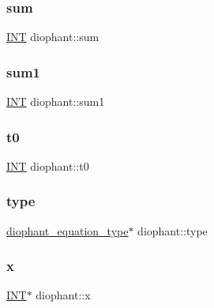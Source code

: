 \subsubsection{\texorpdfstring{sum}{sum}}
{\footnotesize\ttfamily \mbox{\hyperlink{galois_8h_a09fddde158a3a20bd2dcadb609de11dc}{I\+NT}} diophant\+::sum}

\mbox{\label{classdiophant_ae378b5517e44fcbe995f7727a1dc860d}} 
\subsubsection{\texorpdfstring{sum1}{sum1}}
{\footnotesize\ttfamily \mbox{\hyperlink{galois_8h_a09fddde158a3a20bd2dcadb609de11dc}{I\+NT}} diophant\+::sum1}

\mbox{\label{classdiophant_aff5ee754346a1b66cfe42895a48e88c6}} 
\subsubsection{\texorpdfstring{t0}{t0}}
{\footnotesize\ttfamily \mbox{\hyperlink{galois_8h_a09fddde158a3a20bd2dcadb609de11dc}{I\+NT}} diophant\+::t0}

\mbox{\label{classdiophant_a089f5e7dd94bc91819ebd3e6cce7ff76}} 
\subsubsection{\texorpdfstring{type}{type}}
{\footnotesize\ttfamily \mbox{\hyperlink{galois_8h_a331aa0f3283349b42f6bab83e017cdc1}{diophant\+\_\+equation\+\_\+type}}$\ast$ diophant\+::type}

\mbox{\label{classdiophant_a1e722a7e3648efbcab62525e60026646}} 
\subsubsection{\texorpdfstring{x}{x}}
{\footnotesize\ttfamily \mbox{\hyperlink{galois_8h_a09fddde158a3a20bd2dcadb609de11dc}{I\+NT}}$\ast$ diophant\+::x}


